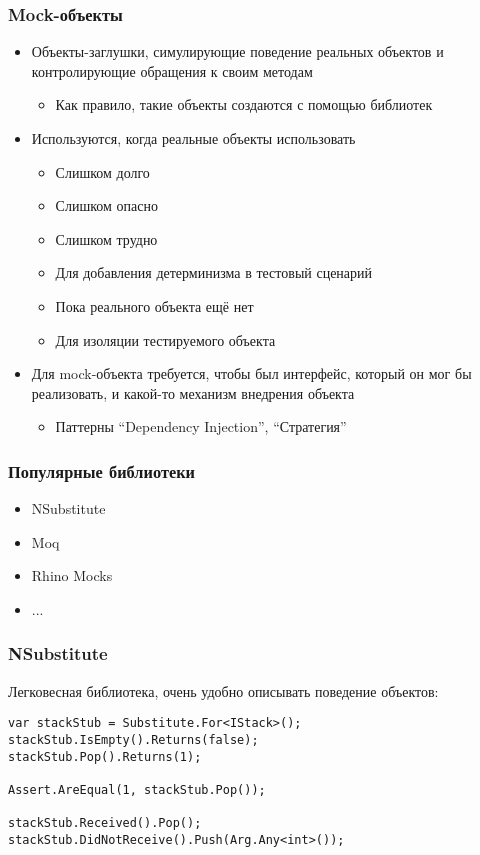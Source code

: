 \documentclass[xetex,mathserif,serif]{beamer}
\begin{document}
	\begin{frame}
		\frametitle{Mock-объекты}
		\begin{itemize}
			\item Объекты-заглушки, симулирующие поведение реальных объектов и контролирующие обращения к своим методам
			\begin{itemize}
				\item Как правило, такие объекты создаются с помощью библиотек
			\end{itemize}
			\item Используются, когда реальные объекты использовать
			\begin{itemize}
				\item Слишком долго
				\item Слишком опасно
				\item Слишком трудно
				\item Для добавления детерминизма в тестовый сценарий
				\item Пока реального объекта ещё нет
				\item Для изоляции тестируемого объекта
			\end{itemize}
			\item Для mock-объекта требуется, чтобы был интерфейс, который он мог бы реализовать, и какой-то механизм внедрения объекта
			\begin{itemize}
				\item Паттерны ``Dependency Injection'', ``Стратегия''
			\end{itemize}
		\end{itemize}
	\end{frame}

	\begin{frame}
		\frametitle{Популярные библиотеки}
		\begin{itemize}
			\item NSubstitute
			\item Moq
			\item Rhino Mocks
			\item ...
		\end{itemize}
	\end{frame}

	\begin{frame}[fragile]
		\frametitle{NSubstitute}
		Легковесная библиотека, очень удобно описывать поведение объектов:
		\vspace{3mm}
		\begin{verbatim}
var stackStub = Substitute.For<IStack>();
stackStub.IsEmpty().Returns(false);
stackStub.Pop().Returns(1);

Assert.AreEqual(1, stackStub.Pop());

stackStub.Received().Pop();
stackStub.DidNotReceive().Push(Arg.Any<int>());
		\end{verbatim}
	\end{frame}
\end{document}
